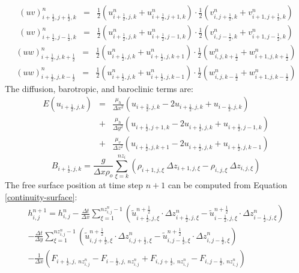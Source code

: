 \begin{eqnarray*}
(uv)^n_{i+ \frac{1}{2} ,j+ \frac{1}{2} ,k}&=&\frac{1}{2}(u^n_{i+
\frac{1}{2} ,j,k}+u^n_{i+ \frac{1}{2} ,j+1,k})
\cdot \frac{1}{2}(v^n_{i,j+ \frac{1}{2} ,k}+v^n_{i+1,j+ \frac{1}{2} ,k})\\
(uv)^n_{i+ \frac{1}{2} ,j- \frac{1}{2} ,k}&=&\frac{1}{2}(u^n_{i+
\frac{1}{2} ,j,k}+u^n_{i+ \frac{1}{2} ,j-1,k}) \cdot
\frac{1}{2}(v^n_{i,j- \frac{1}{2} ,k}+v^n_{i+1,j- \frac{1}{2} ,k})
\end{eqnarray*}
\begin{eqnarray*}
(uw)^n_{i+ \frac{1}{2} ,j ,k+ \frac{1}{2}}&=&\frac{1}{2}(u^n_{i+
\frac{1}{2} ,j,k}+u^n_{i+ \frac{1}{2} ,j,k+1}) \cdot
\frac{1}{2}(w^n_{i,j ,k+ \frac{1}{2}}+w^n_{i+1,j ,k+
\frac{1}{2}})\\ (uw)^n_{i+ \frac{1}{2} ,j ,k-
\frac{1}{2}}&=&\frac{1}{2}(u^n_{i+ \frac{1}{2} ,j,k}+u^n_{i+
\frac{1}{2} ,j,k-1}) \cdot \frac{1}{2}(w^n_{i,j ,k-
\frac{1}{2}}+w^n_{i+1,j ,k- \frac{1}{2}})
\end{eqnarray*}
 The diffusion, barotropic, and baroclinic terms are:
\begin{eqnarray}
E(u_{i+ \frac{1}{2} ,j,k}) &=& \frac{\mu_h}{\Delta x^2} (u_{i +
\frac{3}{2},
j,k}-2u_{i+ \frac{1}{2} ,j,k} + u_{i- \frac{1}{2} , j,k})\nonumber \\
&+& \frac{\mu_h}{\Delta y^2} (u_{i + \frac{1}{2},
j+1,k}-2u_{i+ \frac{1}{2} ,j,k} + u_{i+ \frac{1}{2} ,j-1,k})\nonumber \\
&+& \frac{\mu_v}{\Delta z^2} (u_{i+ \frac{1}{2} ,j,k+1}-2u_{i+
\frac{1}{2} ,j,k}+u_{i+ \frac{1}{2} ,j,k-1})
\end{eqnarray}
\begin{equation}
B_{i+ \frac{1}{2} ,j,k}= \frac{g}{\Delta x \rho_o}
\sum_{\xi=k}^{nz_i}(\rho_{i+1,j,\xi} \ \Delta
z_{i+1,j,\xi}-\rho_{i,j,\xi} \ \Delta z_{i,j,\xi})
\end{equation}
 The free surface position at time step $n+1$ can be computed
from Equation \ref{continuity-surface}:
\begin{eqnarray}
h_{i,j}^{n+1}=h_{i,j}^n - \frac{\Delta t}{\Delta x}
\sum_{\xi=1}^{nz_{i,j}^n-1} ( \widetilde{u}_{i+ \frac{1}{2},j ,\xi}^{n +
\frac{1}{2}}  \cdot \Delta z_{i+ \frac{1}{2},j,\xi}^n -
\widetilde{u}_{i- \frac{1}{2},j,\xi}^{n + \frac{1}{2}}  \cdot
\Delta z_{i- \frac{1}{2},j , \xi}^n) \nonumber \\
- \frac{\Delta t}{\Delta y}
\sum_{\xi=1}^{nz_{i,j}^n-1} ( \widetilde{u}_{i,j+ \frac{1}{2},\xi}^{n +
\frac{1}{2}}  \cdot \Delta z_{i,j+ \frac{1}{2},\xi}^n -
\widetilde{u}_{i,j- \frac{1}{2},\xi}^{n + \frac{1}{2}}  \cdot
\Delta z_{i,j- \frac{1}{2}, \xi}^n)\nonumber \\
-\frac{1}{\Delta x}(  F_{i+ \frac{1}{2},j ,\ nz^n_{i,j}}- F_{i-
\frac{1}{2},j ,\ nz^n_{i,j}}+F_{i,j+ \frac{1}{2},\ nz^n_{i,j}}- F_{i,j-
\frac{1}{2},\ nz^n_{i,j}} )
\end{eqnarray}
